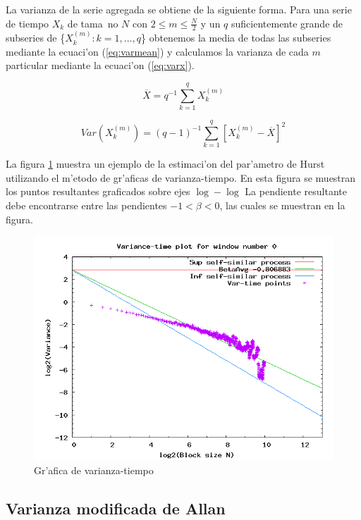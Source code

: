 La varianza de la serie agregada se obtiene de la siguiente forma. Para una
serie de tiempo $X_k$ de tama~no $N$ con $ 2 \le m \le \frac{N}{2}$ y un $q$
suficientemente grande de subseries de \{$X_k^{(m)} : k=1,...,q$\} obtenemos la
media de todas las subseries mediante la ecuaci'on (\ref{eq:varmean}) y
calculamos la varianza de cada $m$ particular mediante la ecuaci'on
(\ref{eq:varx}).

\begin{equation} \label{eq:varmean}
\overline{X} = q^{-1} \sum_{k=1}^{q}{X_k^{(m)}}
\end{equation}

\begin{equation} \label{eq:varx}
Var(X_k^{(m)}) = (q -1)^{-1} \sum_{k=1}^{q}{[X_k^{(m)} - \overline{X}]^2}
\end{equation}

La figura \ref{fig:vartimeplot} muestra un ejemplo de la estimaci'on del
par'ametro de Hurst utilizando el m'etodo de gr'aficas de varianza-tiempo. En
esta figura se muestran los puntos resultantes graficados sobre ejes
$\log - \log$ La pendiente resultante debe encontrarse entre las pendientes
$-1 < \beta < 0$, las cuales se muestran en la figura.

\begin{figure}[h]
\centering
\includegraphics[scale=0.4,type=png,ext=.png,read=.png]{figures/vartimeplot}
\caption{Gr'afica de varianza-tiempo}
\label{fig:vartimeplot}
\end{figure}

\subsection{Varianza modificada de Allan} \label{subsect:mavar}

